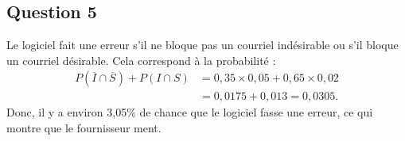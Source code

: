 \subsection*{Question 5}

Le logiciel fait une erreur s'il ne bloque pas un courriel indésirable ou s'il bloque un courriel désirable. Cela correspond à la probabilité :
\begin{align*}
	P(\overline{I} \cap \overline{S}) + P(I \cap S) &= 0,35 \times 0,05 + 0,65 \times 0,02 \\
	&= 0,0175 + 0,013 = 0,0305.
\end{align*}
Donc, il y a environ 3,05\% de chance que le logiciel fasse une erreur, ce qui montre que le fournisseur ment.
